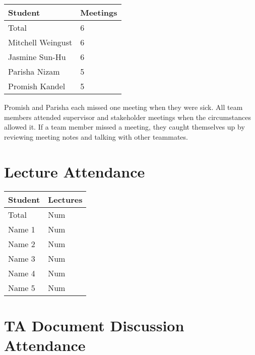 \documentclass{article}
\begin{document}
\begin{table}[H]
\centering
\begin{tabular}{ll}
\toprule
\textbf{Student} & \textbf{Meetings}\\
\midrule
Total & 6\\
Mitchell Weingust & 6\\
Jasmine Sun-Hu & 6\\
Parisha Nizam & 5\\
Promish Kandel & 5\\
\bottomrule
\end{tabular}
\end{table}

Promish and Parisha each missed one meeting when they were sick. All team members attended supervisor and stakeholder meetings when the circumstances allowed it.
If a team member missed a meeting, they caught themselves up by reviewing meeting notes and talking with other teammates.

\section{Lecture Attendance}


\begin{table}[H]
\centering
\begin{tabular}{ll}
\toprule
\textbf{Student} & \textbf{Lectures}\\
\midrule
Total & Num\\
Name 1 & Num\\
Name 2 & Num\\
Name 3 & Num\\
Name 4 & Num\\
Name 5 & Num\\
\bottomrule
\end{tabular}
\end{table}


\section{TA Document Discussion Attendance}
\end{document}
